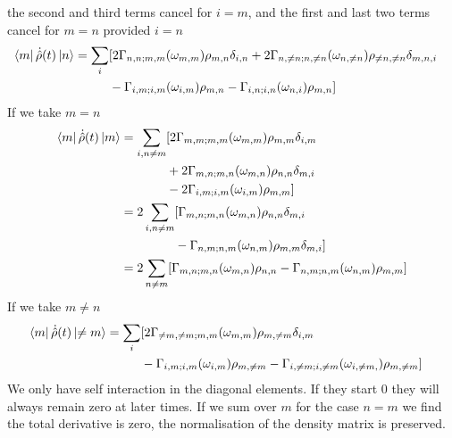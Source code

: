 the second and third terms cancel
for \(i=m\), and the first and
last two terms cancel for \(m=n\)
provided \(i = n\)
\begin{align}
    \bra{m}\dot{\hat{\rho}}(t) \ket{n} & = \begin{aligned}[t]
        \sum_{i} &
        [2 \Gamma_{n,n;m, m}(\omega_{m,m})\rho_{m, n}\delta_{i,n}
        + 2\Gamma_{n,\neq n;n, \neq n}(\omega_{n,\neq n})\rho_{\neq n, \neq n}\delta_{m,n, i} \\
                 &
                - \Gamma_{i,m;i, m}(\omega_{i,m})\rho_{m, n}
                - \Gamma_{ i,n;i,n}(\omega_{n,i})\rho_{m, n}]
    \end{aligned}
\end{align}
If we take \(m=n\)
\begin{align}
    \bra{m}\dot{\hat{\rho}}(t) \ket{m} & = \begin{aligned}[t]
        \sum_{i, n\neq m} &
        [2 \Gamma_{m,m;m, m}(\omega_{m,m})\rho_{m, m}\delta_{i,m} \\ &
        + 2\Gamma_{m,n;m, n}(\omega_{m,n})\rho_{n, n}\delta_{m,i} \\
                          &
                - 2 \Gamma_{i,m;i, m}(\omega_{i,m})\rho_{m, m}]
    \end{aligned} \\
                                       & = \begin{aligned}[t]
        2\sum_{i,  n\neq m} &
        [\Gamma_{m,n;m, n}(\omega_{m,n})\rho_{n, n}\delta_{m,i} \\
                            &
                - \Gamma_{n,m;n, m}(\omega_{n,m})\rho_{m, m}\delta_{m,i}]
    \end{aligned} \\
                                       & =
    2\sum_{n\neq m}[
        \Gamma_{m,n;m, n}(\omega_{m,n})\rho_{n, n}
        - \Gamma_{n,m;n, m}(\omega_{n,m})\rho_{m, m}]
    \label{eqn:cross terms density matrix evolution}
\end{align}
If we take \(m \neq n\)
\begin{align}
    \bra{m}\dot{\hat{\rho}}(t) \ket{\neq m} & = \begin{aligned}[t]
        \sum_{i} &
        [2 \Gamma_{\neq m,\neq m;m, m}(\omega_{m,m})\rho_{m, \neq m}\delta_{i,m} \\
                 &
                - \Gamma_{i,m;i, m}(\omega_{i,m})\rho_{m, \neq m}
                - \Gamma_{ i,\neq m; i, \neq m}(\omega_{i, \neq m,})\rho_{m, \neq m}]
    \end{aligned}
\end{align}
We only have self interaction
in the diagonal elements.
If they start 0 they will
always remain zero at
later times. If we
sum over \(m\) for the
case \(n=m\) we find
the total derivative is
zero, the normalisation of
the density matrix is preserved.


